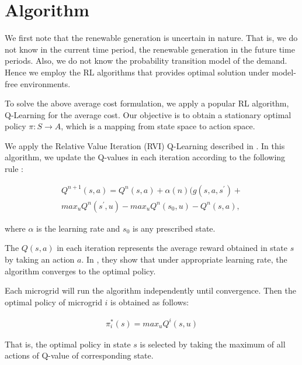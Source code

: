 \section{Algorithm}\label{sec:algo}
We first note that the renewable generation is uncertain in nature. That is, we do not know in the current time period, the renewable generation in the future time periods. Also, we do not know the probability transition model of the demand. Hence we employ the RL algorithms that provides optimal solution under model-free environments.

To solve the above average cost formulation, we apply a popular RL algorithm, Q-Learning for the average cost. Our objective is to obtain a stationary optimal policy $\pi : S \rightarrow A$, which is a mapping from state space to action space.  

We apply the Relative Value Iteration (RVI) Q-Learning described in \cite{avgcost}. In this algorithm, we update the Q-values in each iteration according to the following rule :

\begin{align}
Q^{n+1}(s,a) = Q^{n}(s,a) + \alpha(n)(g(s,a,s^{'}) + \\ max_{u} Q^{n}(s^{'},u) - max_{u} Q^{n}(s_{0},u) - Q^{n}(s,a),
\end{align}

where $\alpha$ is the learning rate and $s_{0}$ is any prescribed state.

The $Q(s,a)$ in each iteration represents the average reward obtained in state $s$ by taking an action $a$. In \cite{avgcost}, they show that under appropriate learning rate, the algorithm converges to the  optimal policy. 

Each microgrid will run the algorithm independently until convergence. Then the optimal policy of microgrid $i$ is obtained as follows:

\begin{align}
\pi_{i}^{*}(s) = max_{u}Q^{i}(s,u)
\end{align}

That is, the optimal policy in state $s$ is selected by taking the maximum of all actions of Q-value of corresponding state. 

